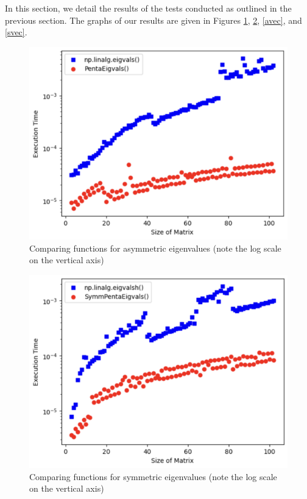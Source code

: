 \documentclass[10pt,twocolumn]{article}
\begin{document}
In this section, we detail the results of the tests conducted as outlined in the previous section. The graphs of our results are given in Figures \ref{aval}, \ref{sval}, \ref{avec}, and \ref{svec}.

    \begin{figure}[h!]
    \centering
    \includegraphics[scale=0.35]{aval.png}
    \caption{Comparing functions for asymmetric eigenvalues (note the log scale on the vertical axis)}
    \label{aval}
\end{figure}
\begin{figure}[h!]
    \centering
    \includegraphics[scale=0.35]{sval.png}
    \caption{Comparing functions for symmetric eigenvalues (note the log scale on the vertical axis)}
    \label{sval}
\end{figure}
\end{document}
